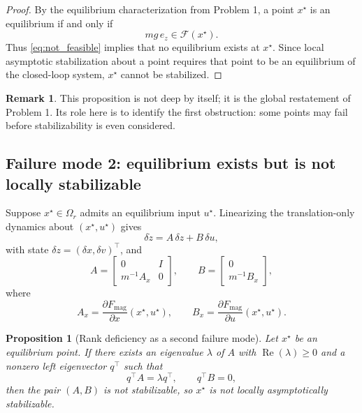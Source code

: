 \documentclass[11pt]{article}
\newtheorem{proposition}{Proposition}
\theoremstyle{definition}
\newtheorem{remark}{Remark}
\begin{document}
\begin{proof}
By the equilibrium characterization from Problem 1, a point $x^\star$ is an equilibrium if and only if
\[
mg\,e_z\in\mathcal{F}(x^\star).
\]
Thus \eqref{eq:not_feasible} implies that no equilibrium exists at $x^\star$. Since local asymptotic stabilization about a point requires that point to be an equilibrium of the closed-loop system, $x^\star$ cannot be stabilized.
\end{proof}

\begin{remark}
This proposition is not deep by itself; it is the global restatement of Problem 1. Its role here is to identify the first obstruction: some points may fail before stabilizability is even considered.
\end{remark}

\subsection{Failure mode 2: equilibrium exists but is not locally stabilizable}

Suppose $x^\star\in\Omega_r$ admits an equilibrium input $u^\star$. Linearizing the translation-only dynamics about $(x^\star,u^\star)$ gives
\begin{equation}
 \delta\dot z = A\,\delta z + B\,\delta u,
 \label{eq:linsys}
\end{equation}
with state $\delta z=(\delta x,\delta v)^\top$, and
\begin{equation}
 A=
 \begin{bmatrix}
 0 & I\\
 m^{-1}A_x & 0
 \end{bmatrix},
 \qquad
 B=
 \begin{bmatrix}
 0\\
 m^{-1}B_x
 \end{bmatrix},
 \label{eq:AB}
\end{equation}
where
\[
A_x=\frac{\partial F_{\mathrm{mag}}}{\partial x}(x^\star,u^\star),
\qquad
B_x=\frac{\partial F_{\mathrm{mag}}}{\partial u}(x^\star,u^\star).
\]

\begin{proposition}[Rank deficiency as a second failure mode]
Let $x^\star$ be an equilibrium point. If there exists an eigenvalue $\lambda$ of $A$ with $\operatorname{Re}(\lambda)\ge 0$ and a nonzero left eigenvector $q^\top$ such that
\begin{equation}
 q^\top A = \lambda q^\top,
 \qquad
 q^\top B = 0,
 \label{eq:PBHfail}
\end{equation}
then the pair $(A,B)$ is not stabilizable, so $x^\star$ is not locally asymptotically stabilizable.
\end{proposition}
\end{document}

